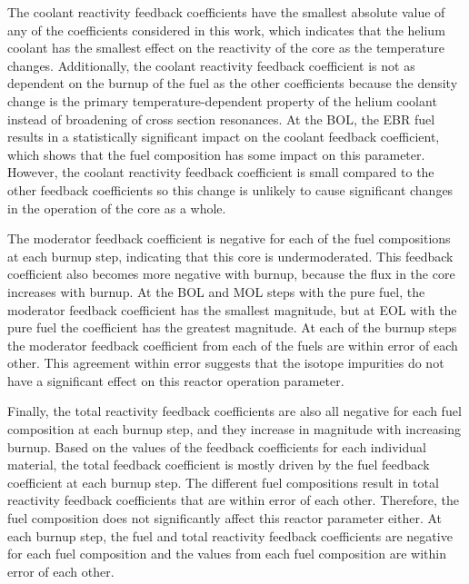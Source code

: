The coolant reactivity feedback coefficients have the smallest absolute 
value of any of the coefficients considered in this work, which 
indicates that the helium coolant has the smallest effect on the reactivity 
of the core as the temperature changes. Additionally, the coolant 
reactivity feedback coefficient is not as dependent on the burnup of the 
fuel as the other coefficients because the density change 
is the primary temperature-dependent property of the helium coolant 
instead of broadening of cross section resonances. 
At the \gls*{BOL}, the \gls*{EBR} fuel results in a statistically 
significant impact on the 
coolant feedback coefficient, which shows that the fuel composition has some 
impact on this parameter. However, the coolant reactivity feedback 
coefficient is small compared to the other feedback coefficients so this 
change is unlikely to cause significant changes in the operation of the 
core as a whole. 

The moderator feedback coefficient is negative for each of the fuel 
compositions at each burnup step, indicating that this core is 
undermoderated. This feedback coefficient also becomes more 
negative with burnup, because the flux in the core increases with 
burnup. At the \gls*{BOL} and 
\gls*{MOL} steps with the pure fuel, the moderator 
feedback coefficient has the smallest magnitude, but at \gls*{EOL} with the 
pure fuel the coefficient has the greatest magnitude. At each of the burnup steps the moderator 
feedback coefficient from each of the fuels are within error of each 
other. This agreement within error suggests that the isotope impurities 
do not have a significant effect on this reactor operation parameter. 

Finally, the total reactivity feedback coefficients are also all negative 
for each fuel composition at each burnup step, and they increase in 
magnitude with increasing burnup. Based on the values of the feedback 
coefficients for each individual material, the total feedback coefficient 
is mostly driven by the fuel feedback coefficient at each burnup step. 
The different fuel compositions result in total reactivity feedback 
coefficients that are within error of each other. Therefore, the fuel 
composition does not significantly affect this reactor parameter either. 
At each burnup step, the fuel and total reactivity feedback coefficients are 
negative for each fuel composition and the values from each fuel composition 
are within error of each other. 